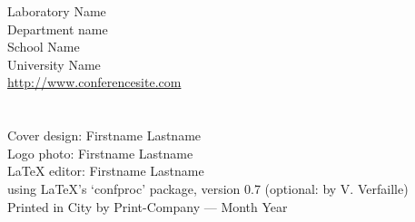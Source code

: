 \documentclass[letterpaper,%
  10pt,%
  twoside,%
  twosidepapers,%
  electronic,%
  binding=0mm,%
  papers=final,%
  headers=exceptpdf,%
  bib=backref,%
  paperselec=all,%
  onecoltoc,%
  tocnum=left,%
  twocolbib,%
  threecolindex,%
  checktitle=false,%
  checkauthor=false,%
  showpapernumber=false,%
  movepagenumber=false,%
  showmarginlines=false,%
  colorheaders=black,%
  debug=false,%
  verbose=false,%
  pdftk=true,%
  hyperref={bookmarksdepth=1,bookmarksopen,bookmarksopenlevel=0,%
    linkcolor=colorforlink,urlcolor=colorforurl}, %
  geometry={text={175truemm,226truemm},%
    inner=0.805in,top=29.15mm,bottom=24.5mm,footskip=9.68mm,voffset=-5mm},%
  ]{confproc}
\author{\procpdfauthor}
\title{\DAFxname\\ \DAFxaddress}
\date{\DAFxdate}
\renewcommand{\contentsname}{Day-by-Day Conference Program}
\newcommand{\PICTPATH}{pictures/}
\begin{document}
\frontmatter
\setcounter{page}{1}
\maketitle
\renewcommand{\contentsname}{\texorpdfstring{}{Conference Program}}
\newpage
\vspace*{1.7cm}
\thispagestyle{empty}
\\ Laboratory Name\\ Department name\\
School Name\\ University Name\\
\url{http://www.conferencesite.com}\\
\vspace*{0.15cm}\newline
{}\\
\vspace*{0.35cm}\newline
{}\\
Cover design: Firstname Lastname\\
Logo photo: Firstname Lastname\\
\LaTeX{} editor: Firstname Lastname\\
using \LaTeX's `confproc' package, version 0.7 (optional: by V. Verfaille)\\
\vspace*{0.35cm}\newline
\noindent  Printed in City by Print-Company --- Month Year
\otherpagestyle
\clearsingleordoublepage
\vspace*{0.6cm}
\thisotherpagestyle
{}
\end{document}
